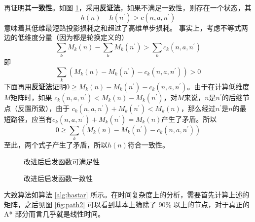     再证明其\textbf{一致性}。如图 \ref{fig:astarcon}，采用\textbf{反证法}，如果不满足一致性，则存在一个状态，其
    \begin{equation*}
        h(n)-h(n^\prime)> c(n,a,n^\prime)
    \end{equation*}
    意味着其低维最短路投影损耗之和超过了高维单步损耗。
    事实上，考虑不等式两边的低维度分量（因为都是轮换定义的）
    \begin{equation*}
        \sum_k M_k(n) - \sum_k M_k(n^\prime) > \sum_k c_k(n,a,n^\prime)
    \end{equation*}
    即
    \begin{equation*}
        \sum_k\left(M_k(n)-M_k(n^\prime)-c_k(n,a,n^\prime)\right)>0
    \end{equation*}
    下面再用\textbf{反证法}证明$0\geq M_k(n)-M_k(n^\prime)-c_k(n,a,n^\prime)$。由于在计算低维度$M$矩阵时，如果 $c_k(n,a,n^\prime)<M_k(n)-M_k(n^\prime)$，对$M$来说，$n$是$n^\prime$的后继节点（反置所致），由于 $c_k(n,a,n^\prime)+M_k(n^\prime)<M_k(n)$，那么经过$n^\prime$是$n$的最短路径，应当有$c_k(n,a,n^\prime)+M_k(n^\prime)=M_k(n)$产生了矛盾。所以
    \begin{equation*}
        0\geq\sum_k\left(M_k(n)-M_k(n^\prime)-c_k(n,a,n^\prime)\right)
    \end{equation*}
    至此，两个式子产生了矛盾，所以$h(n)$符合一致性。

    \begin{figure}[H]
        \centering
        \begin{minipage}{0.48\textwidth}
            \centering
            
            \caption{改进后启发函数可满足性}\label{fig:astarsat}
        \end{minipage}
        \begin{minipage}{0.48\textwidth}
            \centering
            
            \caption{改进后启发函数一致性}\label{fig:astarcon}
        \end{minipage}
    \end{figure}

    大致算法如算法 \ref{alg:hastar} 所示。在时间复杂度上的分析，需要首先计算上述的矩阵，之后见图 \ref{fig:path2} 可以看到基本上筛除了 90\% 以上的节点，对于真正的 A* 部分而言几乎就是线性时间。

